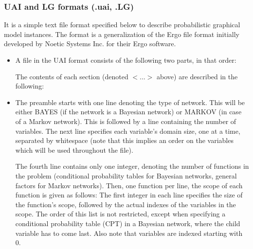 \documentclass[letterpaper,10pt,openany,oneside,english]{sphinxmanual}
\begin{document}
\subsubsection{UAI and LG formats (.uai, .LG)}
\label{\detokenize{formats/uailgformat:uai-and-lg-formats-uai-lg}}\label{\detokenize{formats/uailgformat:uai-lg-format}}\label{\detokenize{formats/uailgformat::doc}}
\sphinxAtStartPar
It is a simple text file format specified below to describe probabilistic graphical model instances. The format is a generalization of the Ergo file format initially developed by Noetic Systems Inc. for their Ergo software.
\begin{itemize}
\item {} 
\sphinxAtStartPar
{}

\sphinxAtStartPar
A file in the UAI format consists of the following two parts, in that order:

\begin{sphinxVerbatim}[commandchars=\\\{\}]

 
\end{sphinxVerbatim}

\sphinxAtStartPar
The contents of each section (denoted \(<...>\) above) are described in the following:

\item {} 
\sphinxAtStartPar
{}

\sphinxAtStartPar
The preamble starts with one line denoting the type of network. This will be either BAYES (if the network is a Bayesian network) or MARKOV (in case of a Markov network). This is followed by a line containing the number of variables. The next line specifies each variable’s domain size, one at a time, separated by whitespace (note that this implies an order on the variables which will be used throughout the file).

\sphinxAtStartPar
The fourth line contains only one integer, denoting the number of functions in the problem (conditional probability tables for Bayesian networks, general factors for Markov networks). Then, one function per line, the scope of each function is given as follows: The first integer in each line specifies the size of the function’s scope, followed by the actual indexes of the variables in the scope. The order of this list is not restricted, except when specifying a conditional probability table (CPT) in a Bayesian network, where the child variable has to come last. Also note that variables are indexed starting with 0.


\end{itemize}
\end{document}
